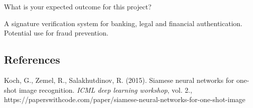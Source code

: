 \documentclass[11pt]{article}
\begin{document}
What is your expected outcome for this project?
    \begin{itemize}
        A signature verification system for banking, legal and financial authentication. Potential use for fraud prevention.
    \end{itemize}

\subsection{References}
\begin{itemize}
      Koch, G., Zemel, R., Salakhutdinov, R. (2015). Siamese neural networks for one-shot image recognition. \textit{ICML deep learning workshop}, vol. 2., https://paperswithcode.com/paper/siamese-neural-networks-for-one-shot-image
  \end{itemize}
\end{document}
